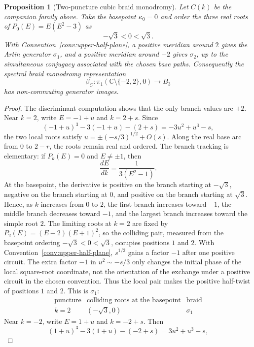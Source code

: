 \documentclass[11pt]{article}
\newtheorem{proposition}[theorem]{Proposition}
\numberwithin{equation}{section}
\newcommand{\bbC}{\mathbb C}
\begin{document}
\begin{proposition}[Two-puncture cubic braid monodromy]\label{prop:cubic-two-puncture}
Let \(C(k)\) be the companion family above.  Take the basepoint
\(\kappa_0=0\) and order the three real roots of \(P_0(E)=E(E^2-3)\) as
\[
  -\sqrt3<0<\sqrt3.
\]
With Convention~\ref{conv:upper-half-plane}, a positive meridian
around \(2\) gives the Artin generator \(\sigma_1\), and a positive meridian
around \(-2\) gives \(\sigma_2\), up to the simultaneous conjugacy associated
with the chosen base paths.  Consequently the spectral braid monodromy
representation
\[
  \beta_C:\pi_1(\bbC\setminus\{-2,2\},0)\longrightarrow B_3
\]
has non-commuting generator images.
\end{proposition}

\begin{proof}
The discriminant computation shows that the only branch values are
\(\pm2\).  Near \(k=2\), write \(E=-1+u\) and \(k=2+s\).  Since
\[
  (-1+u)^3-3(-1+u)-(2+s)=-3u^2+u^3-s,
\]
the two local roots satisfy \(u=\pm(-s/3)^{1/2}+O(s)\).  Along the real
base arc from \(0\) to \(2-r\), the roots remain real and ordered.  The branch tracking is elementary: if
\(P_k(E)=0\) and \(E\ne\pm1\), then
\[
  \frac{dE}{dk}=\frac{1}{3(E^2-1)}.
\]
At the basepoint, the derivative is positive on the branch starting at
\(-\sqrt3\), negative on the branch starting at \(0\), and positive on the
branch starting at \(\sqrt3\).  Hence, as \(k\) increases from \(0\) to
\(2\), the first branch increases toward \(-1\), the middle branch decreases
toward \(-1\), and the largest branch increases toward the simple root
\(2\).  The limiting roots at \(k=2\) are fixed by
\(P_2(E)=(E-2)(E+1)^2\), so the colliding pair, measured from the basepoint
ordering \(-\sqrt3<0<\sqrt3\), occupies positions \(1\) and \(2\).
With Convention~\ref{conv:upper-half-plane}, \(s^{1/2}\) gains a factor
\(-1\) after one positive circuit.  The extra factor \(-1\) in
\(u^2\sim -s/3\) only changes the initial phase of the local square-root
coordinate, not the orientation of the exchange under a positive circuit in
the chosen convention.  Thus the local pair makes the positive half-twist of
positions \(1\) and \(2\).  This is \(\sigma_1\):
\[
\begin{array}{c|c|c}
\text{puncture} & \text{colliding roots at the basepoint} & \text{braid}\\
\hline
 k=2 & (-\sqrt3,0) & \sigma_1
\end{array}
\]
Near
\(k=-2\), write \(E=1+u\) and \(k=-2+s\).  Then
\[
  (1+u)^3-3(1+u)-(-2+s)=3u^2+u^3-s,
\]
\end{proof}
\end{document}
